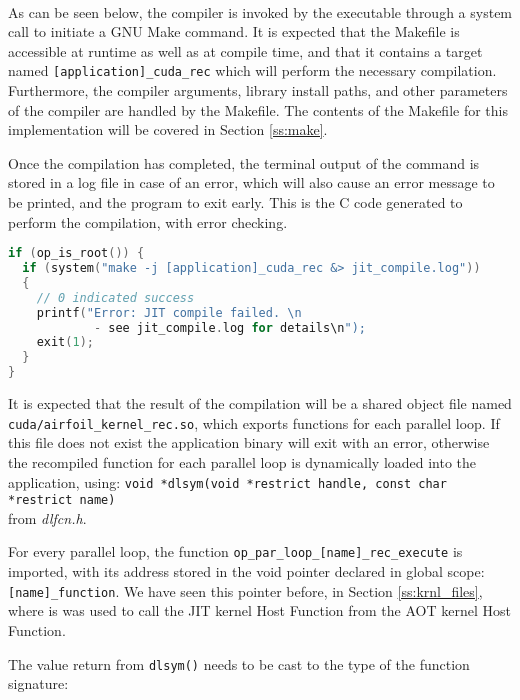 \\
As can be seen below, the compiler is invoked by the executable through a system call to initiate a GNU Make \cite{make} command. It is expected that the Makefile is accessible at runtime as well as at compile time, and that it contains a target named \verb|[application]_cuda_rec| which will perform the necessary compilation. Furthermore, the compiler arguments, library install paths, and other parameters of the compiler are handled by the Makefile. The contents of the Makefile for this implementation will be covered in Section \ref{ss:make}.\par
Once the compilation has completed, the terminal output of the command is stored in a log file in case of an error, which will also cause an error message to be printed, and the program to exit early.
\clearpage
\noindent This is the C code generated to perform the compilation, with error checking.
\vspace{1em}
\begin{lstlisting}[backgroundcolor=\color{red!20}, language=C]
if (op_is_root()) {
  if (system("make -j [application]_cuda_rec &> jit_compile.log"))
  {
    // 0 indicated success
    printf("Error: JIT compile failed. \n
            - see jit_compile.log for details\n");
    exit(1);
  }
}
\end{lstlisting}
\par
\noindent It is expected that the result of the compilation will be a shared object file named\\ \verb|cuda/airfoil_kernel_rec.so|, which exports functions for each parallel loop. If this file does not exist the application binary will exit with an error, otherwise the recompiled function for each parallel loop is dynamically loaded into the application, using: \verb|void *dlsym(void *restrict handle, const char *restrict name)|\\ from \textit{dlfcn.h}.
\par
\noindent For every parallel loop, the function \verb|op_par_loop_[name]_rec_execute| is imported, with its address stored in the void pointer declared in global scope: \verb|[name]_function|. We have seen this pointer before, in Section \ref{ss:krnl_files}, where is was used to call the JIT kernel Host Function from the AOT kernel Host Function.
\par
The value return from \verb|dlsym()| needs to be cast to the type of the function signature: \\
